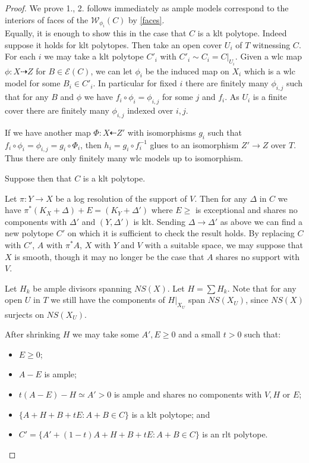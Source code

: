 	\begin{proof}
		
		We prove 1., 2. follows immediately as ample models correspond to the interiors of faces of the $\mathcal{W}_{\phi_{i}}(C)$ by \autoref{faces}.\\	
		
		Equally, it is enough to show this in the case that $C$ is a klt polytope. Indeed suppose it holds for klt polytopes. Then take an open cover $U_{i}$ of $T$ witnessing $C$. For each $i$ we may take a klt polytope $C'_{i}$ with $C'_{i} \sim C_{i}=C|_{U_{i}}$. Given a wlc map $\phi:X \dashrightarrow Z$ for $B \in \mathcal{E}(C)$, we can let $\phi_{i}$ be the induced map on $X_{i}$ which is a wlc model for some $B_{i} \in C'_{i}$. In particular for fixed $i$ there are finitely many $\phi_{i,j}$ such that for any $B$ and $\phi$ we have $f_{i} \circ \phi_{i}=\phi_{i,j}$ for some $j$ and $f_{i}$. As $U_{i}$ is a finite cover there are finitely many $\phi_{i,j}$ indexed over $i,j$.
		
		If we have another map $\Phi:X \dashleftarrow Z'$ with isomorphisms $g_{i}$ such that $f_{i} \circ \phi_{i}=\phi_{i,j}= g_{i} \circ \Phi_{i}$, then $h_{i}=g_{i} \circ f^{-1}_{i}$ glues to an isomorphism $Z' \to Z$ over $T$. Thus there are only finitely many wlc models up to isomorphism.
		
		Suppose then that $C$ is a klt polytope.		
		
		Let $\pi:Y \to X$ be a log resolution of the support of $V$. Then for any $\Delta$ in $C$ we have $\pi^{*}(K_{X}+\Delta)+E=(K_{Y}+\Delta')$ where $E \geq $ is exceptional and shares no components with $\Delta'$ and $(Y,\Delta')$ is klt. Sending $\Delta \to \Delta'$ as above we can find a new polytope $C'$ on which it is sufficient to check the result holds. By replacing $C$ with $C'$, $A$ with $\pi^{*}A$, $X$ with $Y$ and $V$ with a suitable space, we may suppose that $X$ is smooth, though it may no longer be the case that $A$ shares no support with $V$. 
		
		Let $H_{k}$ be ample divisors spanning $NS(X)$. Let $H= \sum H_{k}$. Note that for any open $U$ in $T$ we still have the components of $H|_{X_{U}}$ span $NS(X_{U})$, since $NS(X)$ surjects on $NS(X_{U})$.
		
		After shrinking $H$ we may take some $A',E \geq 0$ and a small $t>0$ such that:
		\begin{itemize}
			\item $E \geq 0$;
			\item $A-E$ is ample;
			\item $t(A-E)-H \simeq A' > 0$ is ample and shares no components with $V,H$ or $E$;
			\item $\{A+H+B+tE \colon A+B \in C\}$ is a klt polytope; and
			\item $C'=\{A'+(1-t)A+H+B+tE \colon A+B \in C\}$ is an rlt polytope.
		\end{itemize}
		

\end{proof}
